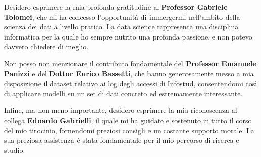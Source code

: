     

\begin{acknowledgments}
    Desidero esprimere la mia profonda gratitudine al \textbf{Professor 
    Gabriele Tolomei}, che mi ha concesso l'opportunità di 
    immergermi nell'ambito della scienza dei dati a livello pratico. 
    La data science rappresenta una disciplina informatica per la 
    quale ho sempre nutrito una profonda passione, e non potevo davvero 
    chiedere di meglio.

    Non posso non menzionare il contributo fondamentale del \textbf{Professor 
    Emanuele Panizzi} e del \textbf{Dottor Enrico Bassetti}, che hanno 
    generosamente messo a mia disposizione il dataset relativo ai log 
    degli accessi di Infostud, consentendomi così di applicare modelli 
    su un set di dati concreto ed estremamente interessante.
    
    Infine, ma non meno importante, desidero esprimere 
    la mia riconoscenza al collega \textbf{Edoardo Gabrielli}, il quale mi ha 
    guidato e sostenuto in tutto il corso del mio tirocinio, fornendomi
    preziosi consigli e un costante supporto morale. La sua preziosa
    assistenza è stata fondamentale per il mio percorso di ricerca e 
    studio.
\end{acknowledgments}